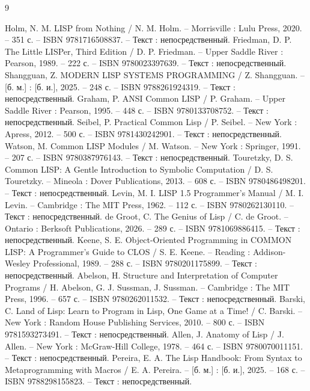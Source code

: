 
\begin{thebibliography}{9}
	
    Holm, N. M. LISP from Nothing / N. M. Holm. -- Morrisville : Lulu Press, 2020. -- 351 с. -- ISBN 9781716508837. -- Текст : непосредственный.
    Friedman, D. P. The Little LISPer, Third Edition / D. P. Friedman. -- Upper Saddle River : Pearson, 1989. -- 222 с. -- ISBN 9780023397639. -- Текст : непосредственный.
    Shangguan, Z. MODERN LISP SYSTEMS PROGRAMMING / Z. Shangguan. -- [б. м.] : [б. и.], 2025. -- 248 с. -- ISBN 9788261924319. -- Текст : непосредственный.
    Graham, P. ANSI Common LISP / P. Graham. -- Upper Saddle River : Pearson, 1995. -- 448 с. -- ISBN 9780133708752. -- Текст : непосредственный.
    Seibel, P. Practical Common Lisp / P. Seibel. -- New York : Apress, 2012. -- 500 с. -- ISBN 9781430242901. -- Текст : непосредственный.
    Watson, M. Common LISP Modules / M. Watson. -- New York : Springer, 1991. -- 207 с. -- ISBN 9780387976143. -- Текст : непосредственный.
    Touretzky, D. S. Common LISP: A Gentle Introduction to Symbolic Computation / D. S. Touretzky. -- Mineola : Dover Publications, 2013. -- 608 с. -- ISBN 9780486498201. -- Текст : непосредственный.
    Levin, M. I. LISP 1.5 Programmer's Manual / M. I. Levin. -- Cambridge : The MIT Press, 1962. -- 112 с. -- ISBN 9780262130110. -- Текст : непосредственный.
    de Groot, C. The Genius of Lisp / C. de Groot. -- Ontario : Berksoft Publications, 2026. -- 289 с. -- ISBN 9781069886415. -- Текст : непосредственный.
    Keene, S. E. Object-Oriented Programming in COMMON LISP: A Programmer's Guide to CLOS / S. E. Keene. -- Reading : Addison-Wesley Professional, 1989. -- 288 с. -- ISBN 9780201175899. -- Текст : непосредственный.
    Abelson, H. Structure and Interpretation of Computer Programs / H. Abelson, G. J. Sussman, J. Sussman. -- Cambridge : The MIT Press, 1996. -- 657 с. -- ISBN 9780262011532. -- Текст : непосредственный.
    Barski, C. Land of Lisp: Learn to Program in Lisp, One Game at a Time! / C. Barski. -- New York : Random House Publishing Services, 2010. -- 800 с. -- ISBN 9781593273491. -- Текст : непосредственный.
    Allen, J. Anatomy of Lisp / J. Allen. -- New York : McGraw-Hill College, 1978. -- 464 с. -- ISBN 9780070011151. -- Текст : непосредственный.
    Pereira, E. A. The Lisp Handbook: From Syntax to Metaprogramming with Macros / E. A. Pereira. -- [б. м.] : [б. и.], 2025. -- 168 с. -- ISBN 9788298155823. -- Текст : непосредственный.

\end{thebibliography}
